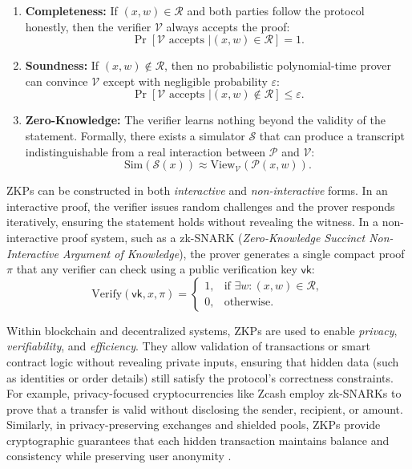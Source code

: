 \documentclass[12pt,a4paper]{article}
\begin{document}
\begin{enumerate}
    \item \textbf{Completeness:} If $(x, w) \in \mathcal{R}$ and both parties follow the protocol honestly, then the verifier $\mathcal{V}$ always accepts the proof:
    $$
    \Pr[\mathcal{V} \text{ accepts } | (x, w) \in \mathcal{R}] = 1.
    $$
    
    \item \textbf{Soundness:} If $(x, w) \notin \mathcal{R}$, then no probabilistic polynomial-time prover can convince $\mathcal{V}$ except with negligible probability $\varepsilon$:
    $$
    \Pr[\mathcal{V} \text{ accepts } | (x, w) \notin \mathcal{R}] \leq \varepsilon.
    $$
    
    \item \textbf{Zero-Knowledge:} The verifier learns nothing beyond the validity of the statement.  
    Formally, there exists a simulator $\mathcal{S}$ that can produce a transcript indistinguishable from a real interaction between $\mathcal{P}$ and $\mathcal{V}$:
    $$
    \text{Sim}(\mathcal{S}(x)) \approx \text{View}_{\mathcal{V}}(\mathcal{P}(x, w)).
    $$
\end{enumerate}

ZKPs can be constructed in both \textit{interactive} and \textit{non-interactive} forms.  
In an interactive proof, the verifier issues random challenges and the prover responds iteratively, ensuring the statement holds without revealing the witness.  
In a non-interactive proof system, such as a zk-SNARK (\textit{Zero-Knowledge Succinct Non-Interactive Argument of Knowledge}), the prover generates a single compact proof $\pi$ that any verifier can check using a public verification key $\mathsf{vk}$:
$$
\text{Verify}(\mathsf{vk}, x, \pi) = 
\begin{cases}
1, & \text{if } \exists w : (x, w) \in \mathcal{R},\\
0, & \text{otherwise.}
\end{cases}
$$

Within blockchain and decentralized systems, ZKPs are used to enable \textit{privacy}, \textit{verifiability}, and \textit{efficiency}.  
They allow validation of transactions or smart contract logic without revealing private inputs, ensuring that hidden data (such as identities or order details) still satisfy the protocol’s correctness constraints.  
For example, privacy-focused cryptocurrencies like Zcash employ zk-SNARKs to prove that a transfer is valid without disclosing the sender, recipient, or amount.  
Similarly, in privacy-preserving exchanges and shielded pools, ZKPs provide cryptographic guarantees that each hidden transaction maintains balance and consistency while preserving user anonymity \parencite{ding2025overview}.
\end{document}
